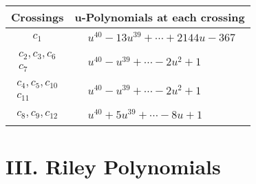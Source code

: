 \documentclass[1p]{elsarticle_modified}
\theoremstyle{definition}
\begin{document}
\begin{tabular}{m{50pt}|m{274pt}}
Crossings & \hspace{64pt}u-Polynomials at each crossing \\
\hline $$\begin{aligned}c_{1}\end{aligned}$$&$\begin{aligned}
&u^{40}-13 u^{39}+\cdots+2144 u-367
\end{aligned}$\\
\hline $$\begin{aligned}c_{2},c_{3},c_{6}\\c_{7}\end{aligned}$$&$\begin{aligned}
&u^{40}- u^{39}+\cdots-2 u^2+1
\end{aligned}$\\
\hline $$\begin{aligned}c_{4},c_{5},c_{10}\\c_{11}\end{aligned}$$&$\begin{aligned}
&u^{40}- u^{39}+\cdots-2 u^2+1
\end{aligned}$\\
\hline $$\begin{aligned}c_{8},c_{9},c_{12}\end{aligned}$$&$\begin{aligned}
&u^{40}+5 u^{39}+\cdots-8 u+1
\end{aligned}$\\
\hline
\end{tabular}\newpage\renewcommand{\arraystretch}{1}
\centering \section*{ III. Riley Polynomials}
\end{document}
